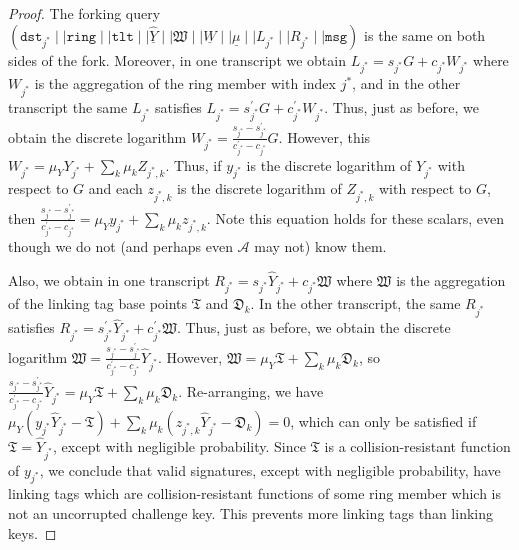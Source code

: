 \documentclass[11pt]{article}
\theoremstyle{definition}
\newcommand{\tlt}{\texttt{tlt}}
\newcommand{\ring}{\texttt{ring}}
\newcommand{\msg}{\texttt{msg}}
\newcommand{\signaturequerystar}{(\texttt{dst}_{j^*} \mid \mid \ring \mid \mid \tlt \mid \mid \underline{\widehat{Y}} \mid \mid \mathfrak{W} \mid \mid \underline{W} \mid \mid \underline{\mu} \mid \mid L_{j^*} \mid \mid R_{j^*} \mid \mid \msg)}
\begin{document}
\begin{proof}
The forking query  $\signaturequerystar$ is the same on both sides of the fork. Moreover, in one transcript we obtain $L_{j^*} = s_{j^*} G + c_{j^*} W_{j^*}$ where $W_{j^*}$ is the aggregation of the ring member with index $j^*$, and in the other transcript the same $L_{j^*}$ satisfies $L_{j^*} = s_{j^*}^\prime G + c_{j^*}^\prime W_{j^*}$. Thus, just as before, we obtain the discrete logarithm $W_{j^*} = \frac{s_{j^*} - s_{j^*}^\prime}{c_{j^*}^\prime - c_{j^*}}G$. However, this $W_{j^*} = \mu_Y Y_{j^*} + \sum_k \mu_k Z_{j^*,k}$. Thus, if $y_{j^*}$ is the discrete logarithm of $Y_{j^*}$ with respect to $G$ and each $z_{j^*,k}$ is the discrete logarithm of $Z_{j^*,k}$ with respect to $G$, then $\frac{s_{j^*} - s_{j^*}^\prime}{c_{j^*}^\prime - c_{j^*}} = \mu_Y y_{j^*} + \sum_k \mu_k z_{j^*,k}$. Note this equation holds for these scalars, even though we do not (and perhaps even $\mathcal{A}$ may not) know them.

Also, we obtain in one transcript $R_{j^*} = s_{j^*} \widehat{Y}_{j^*} + c_{j^*} \mathfrak{W}$ where $\mathfrak{W}$ is the aggregation of the linking tag base points $\mathfrak{T}$ and $\mathfrak{D}_k$. In the other transcript, the same $R_{j^*}$ satisfies $R_{j^*} = s_{j^*}^\prime \widehat{Y}_{j^*} + c_{j^*}^\prime \mathfrak{W}$. Thus, just as before, we obtain the discrete logarithm $\mathfrak{W} = \frac{s_{j^*} - s_{j^*}^\prime}{c_{j^*}^\prime - c_{j^*}}\widehat{Y}_{j^*}$. However, $\mathfrak{W} = \mu_Y \mathfrak{T} + \sum_k \mu_k \mathfrak{D}_k$, so $\frac{s_{j^*} - s_{j^*}^\prime}{c_{j^*}^\prime - c_{j^*}}\widehat{Y}_{j^*} = \mu_Y \mathfrak{T} + \sum_k \mu_k \mathfrak{D}_k$.
Re-arranging, we have $\mu_Y\left(y_{j^*} \widehat{Y}_{j^*} - \mathfrak{T}\right) + \sum_k \mu_k\left(z_{j^*,k} \widehat{Y}_{j^*} - \mathfrak{D}_k\right) = 0$, which can only be satisfied if $\mathfrak{T} = \widehat{Y}_{j^*}$, except with negligible probability. 
Since $\mathfrak{T}$ is a collision-resistant function of $y_{j^*}$, we conclude that valid signatures, except with negligible probability, have linking tags which are collision-resistant functions of some ring member which is not an uncorrupted challenge key. This prevents more linking tags than linking keys.
\end{proof}










% 































\end{document}
